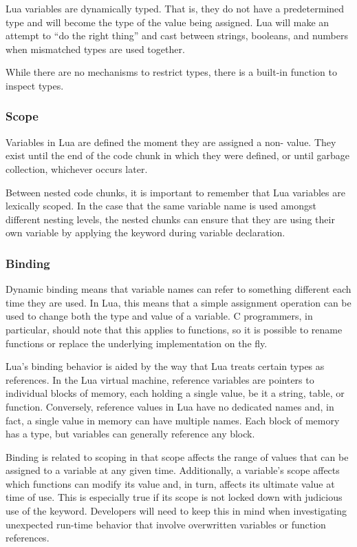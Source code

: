 Lua variables are dynamically typed.  That is, they do not have a predetermined
type and will become the type of the value being assigned.  Lua will make an
attempt to ``do the right thing'' and cast between strings, booleans, and
numbers when mismatched types are used together.

While there are no mechanisms to restrict types, there is a built-in
 function to inspect types.

\subsubsection{Scope}

Variables in Lua are defined the moment they are assigned a non-
value.  They exist until the end of the code chunk in which they were defined,
or until garbage collection, whichever occurs later.

Between nested code chunks, it is important to remember that Lua variables are
lexically scoped.  In the case that the same variable name is used amongst
different nesting levels, the nested chunks can ensure that they are using
their own variable by applying the  keyword during variable
declaration.

\subsubsection{Binding}
\label{sec:DynamicBinding}

Dynamic binding means that variable names can refer to something different each
time they are used.  In Lua, this means that a simple assignment operation can
be used to change both the type and value of a variable.  C programmers, in
particular, should note that this applies to functions, so it is possible to
rename functions or replace the underlying implementation on the fly.

Lua's binding behavior is aided by the way that Lua treats certain types as
references.  In the Lua virtual machine, reference variables are pointers to
individual blocks of memory, each holding a single value, be it a string,
table, or function.  Conversely, reference values in Lua have no dedicated
names and, in fact, a single value in memory can have multiple names.  Each
block of memory has a type, but variables can generally reference any block.

Binding is related to scoping in that scope affects the range of values that
can be assigned to a variable at any given time.  Additionally, a variable's
scope affects which functions can modify its value and, in turn, affects its
ultimate value at time of use.  This is especially true if its scope is not
locked down with judicious use of the  keyword.  Developers will
need to keep this in mind when investigating unexpected run-time behavior that
involve overwritten variables or function references.


